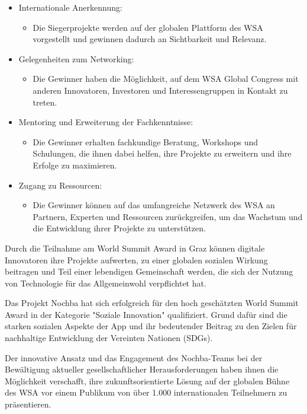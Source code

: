 \begin{itemize}
    \item {Internationale Anerkennung:}
    \begin{itemize}
        \item {Die Siegerprojekte werden auf der globalen Plattform des WSA vorgestellt und gewinnen dadurch an Sichtbarkeit und Relevanz.}
    \end{itemize}
    \item {Gelegenheiten zum Networking:}
    \begin{itemize}
        \item {Die Gewinner haben die Möglichkeit, auf dem WSA Global Congress mit anderen Innovatoren, Investoren und Interessengruppen in Kontakt zu treten.}
    \end{itemize}
    \item {Mentoring und Erweiterung der Fachkenntnisse:}
    \begin{itemize}
        \item {Die Gewinner erhalten fachkundige Beratung, Workshops und Schulungen, die ihnen dabei helfen, ihre Projekte zu erweitern und ihre Erfolge zu maximieren.}
    \end{itemize}
    \item {Zugang zu Ressourcen:}
    \begin{itemize}
        \item {Die Gewinner können auf das umfangreiche Netzwerk des WSA an Partnern, Experten und Ressourcen zurückgreifen, um das Wachstum und die Entwicklung ihrer Projekte zu unterstützen.}
    \end{itemize}
\end{itemize}

Durch die Teilnahme am World Summit Award in Graz können digitale Innovatoren ihre Projekte aufwerten, zu einer globalen sozialen Wirkung beitragen und Teil einer lebendigen Gemeinschaft werden, die sich der Nutzung von Technologie für das Allgemeinwohl verpflichtet hat.

Das Projekt Nochba hat sich erfolgreich für den hoch geschätzten World Summit Award in der Kategorie "Soziale Innovation" qualifiziert. Grund dafür sind die starken sozialen Aspekte der App und ihr bedeutender Beitrag zu den Zielen für nachhaltige Entwicklung der Vereinten Nationen (SDGs). 

Der innovative Ansatz und das Engagement des Nochba-Teams bei der Bewältigung aktueller gesellschaftlicher Herausforderungen haben ihnen die Möglichkeit verschafft, ihre zukunftsorientierte Lösung auf der globalen Bühne des WSA vor einem Publikum von über 1.000 internationalen Teilnehmern zu präsentieren.

